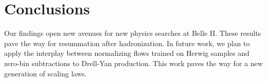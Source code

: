 \section{Conclusions}\label{sec:conclusions}

Our findings open new avenues for new physics searches at Belle II.
These results pave the way for resummation after hadronization. In
future work, we plan to apply the interplay between normalizing flows
trained on Herwig samples and zero-bin subtractions to Drell-Yan
production. This work paves the way for a new generation of scaling
laws.

